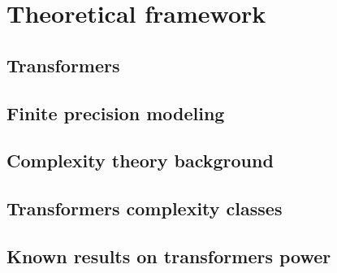 \chapter{Theoretical framework}

\section{Transformers}





\section{Finite precision modeling}\label{repr}


\section{Complexity theory background}\label{circuits}



\section{Transformers complexity classes}



\section{Known results on transformers power}\label{det-bounds}


